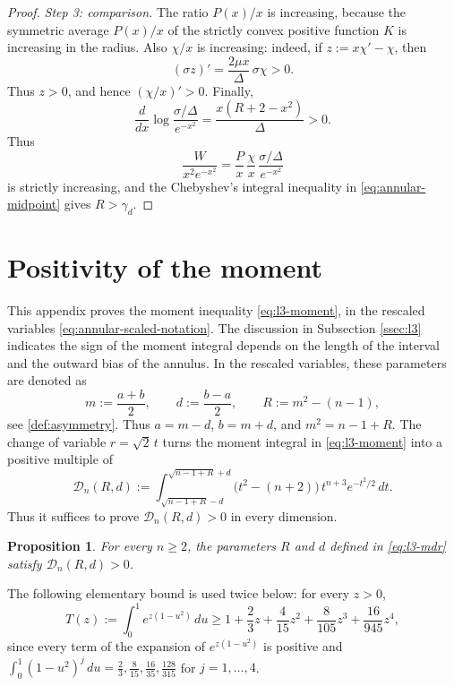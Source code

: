 \documentclass[11pt]{article}
\numberwithin{equation}{section}
\newtheorem{proposition}[theorem]{Proposition}
\theoremstyle{definition}
\begin{document}
\begin{proof}
\emph{Step 3: comparison.} The ratio $P(x)/x$ is increasing, because the symmetric average $P(x)/x$ of the strictly convex positive function $K$ is increasing in the radius. Also $\chi/x$ is increasing: indeed, if $z:=x\chi'-\chi$, then
\[
    (\sigma z)'=\frac{2\mu x}{\Delta}\,\sigma\chi>0.
\]
Thus $z>0$, and hence $(\chi/x)'>0$.
Finally,
\[
    \frac{d}{dx}\log\frac{\sigma/\Delta}{e^{-x^2}}
    =\frac{x(R+2-x^2)}{\Delta}>0.
\]
Thus
\[
    \frac{W}{x^2e^{-x^2}}
    =\frac{P}{x}\,\frac{\chi}{x}\,
      \frac{\sigma/\Delta}{e^{-x^2}}
\]
is strictly increasing, and the Chebyshev's integral inequality  in \eqref{eq:annular-midpoint} gives $R>\gamma_d$.
\end{proof}


\section{Positivity of the moment}\label{sec:l3-details}
This appendix proves the moment inequality \eqref{eq:l3-moment}, in the rescaled variables \eqref{eq:annular-scaled-notation}. 
The discussion in Subsection \ref{ssec:l3} indicates the sign of the moment integral depends on the length of the interval and the outward bias of the annulus. In the rescaled variables, these parameters are denoted as 
\begin{equation}\label{eq:l3-mdr}
    m:=\frac{a+b}{2},\qquad d:=\frac{b-a}{2},
    \qquad R:=m^2-(n-1),
\end{equation}
see \eqref{def:asymmetry}. Thus $a=m-d$, $b=m+d$, and $m^2=n-1+R$. 
The change of variable $r=\sqrt2\,t$ turns the
moment integral in \eqref{eq:l3-moment} into a positive multiple of
\begin{equation}\label{eq:l3-moment-scaled}
    \mathcal D_n(R,d):=
    \int_{\sqrt{n-1+R}-d}^{\sqrt{n-1+R}+d}
    \bigl(t^2-(n+2)\bigr)\,t^{n+3}e^{-t^2/2}\,dt.
\end{equation}
Thus it suffices to prove $\mathcal D_n(R,d)>0$ in every dimension.



\begin{proposition}\label{prop:l3-moment-positive}
For every $n\geq2$, the parameters $R$ and $d$ defined in
\eqref{eq:l3-mdr} satisfy $\mathcal D_n(R,d)>0$.
\end{proposition}

The following elementary bound is used twice below: for every $z>0$,
\begin{equation}\label{eq:l3-T}
    T(z):=\int_0^1e^{z(1-u^2)}\,du
    \geq
    1+\frac23z+\frac4{15}z^2+\frac8{105}z^3+\frac{16}{945}z^4,
\end{equation}
since every term of the expansion of $e^{z(1-u^2)}$ is positive and $\int_0^1(1-u^2)^j\,du=\frac23,\frac8{15},\frac{16}{35},\frac{128}{315}$ for $j=1,\dots,4$.
\end{document}
